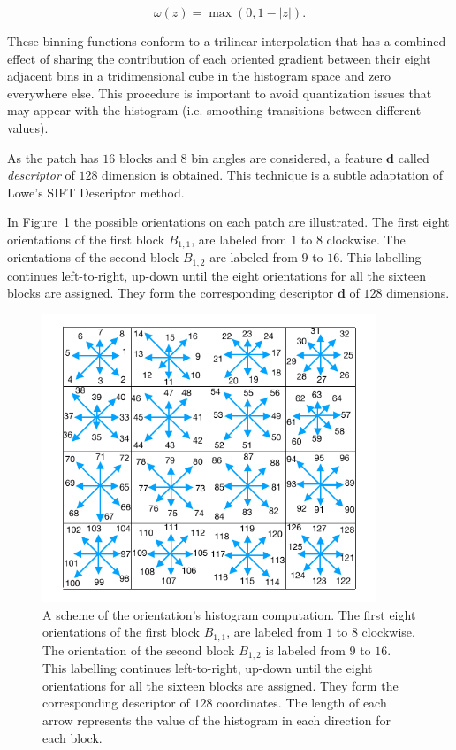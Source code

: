 \documentclass[review]{elsarticle}
\begin{document}
\begin{equation}
\omega(z) = \max(0,1-|z|).
\label{eq:weighting}
\end{equation}

These binning functions conform to a trilinear interpolation that has a combined effect of sharing the contribution of each oriented gradient between their eight adjacent bins in a tridimensional cube in the histogram space and zero everywhere else.  This procedure is important to avoid quantization issues that may appear with the histogram (i.e. smoothing transitions between different values).

As the patch has  $16$ blocks and  $8$ bin angles are considered, a feature $\mathbf{d}$ called \textit{descriptor} of $128$ dimension is obtained. This technique is a subtle adaptation of Lowe's SIFT Descriptor method.

In Figure~\ref{fig:orientationsfull} the possible orientations on each patch are illustrated.  The first eight orientations of the first block $ B_{1,1} $, are labeled from $1$ to $8$ clockwise. The orientations of the second block $ B_{1,2} $ are labeled from $9$ to $16$.  This labelling continues left-to-right, up-down until the eight orientations for all the sixteen blocks are assigned. They form the corresponding descriptor $\mathbf{d}$ of $128$ dimensions.

\begin{figure}[h!]
\centering
\includegraphics[width=10cm]{images/gradientorientations.pdf}
\caption[Gradient Orientation Numbering]{A scheme of the orientation's histogram computation. The first eight orientations of the first block $ B_{1,1} $, are labeled from $1$ to $8$ clockwise. The orientation of the second block $ B_{1,2} $ is labeled from $9$ to $16$.  This labelling continues left-to-right, up-down until the eight orientations for all the sixteen blocks are assigned. They form the corresponding descriptor of $128$ coordinates.  The length of each arrow represents the value of the histogram in each direction for each block.}
\label{fig:orientationsfull}
\end{figure}
\end{document}
